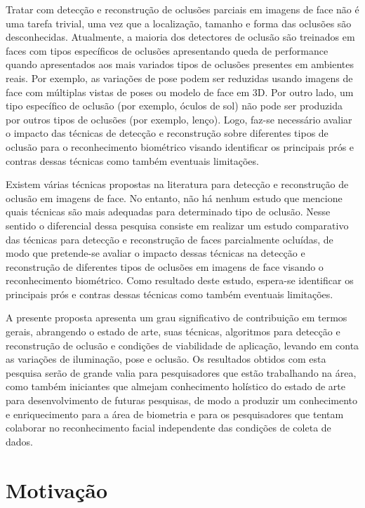 Tratar com detecção e reconstrução de oclusões parciais em imagens de face não é uma tarefa trivial,  uma vez que a localização, tamanho e forma das oclusões são desconhecidas. Atualmente, a maioria dos detectores de oclusão são treinados em faces com tipos específicos de oclusões apresentando queda de performance quando apresentados aos mais variados tipos de oclusões presentes em ambientes reais. Por exemplo, as variações de pose podem ser reduzidas usando imagens de face com múltiplas vistas de poses ou modelo de face em 3D. Por outro lado, um tipo específico de oclusão (por exemplo, óculos de sol) não pode ser produzida por outros tipos de oclusões (por exemplo, lenço). Logo,  faz-se necessário avaliar o impacto das técnicas de detecção e reconstrução sobre diferentes tipos de oclusão para o reconhecimento biométrico visando identificar os principais prós e contras dessas técnicas como também eventuais limitações.




Existem várias técnicas propostas na literatura para detecção e reconstrução de oclusão em imagens de face. No entanto, não há nenhum estudo que mencione quais técnicas são mais adequadas para determinado tipo de oclusão. Nesse sentido o diferencial dessa pesquisa consiste em realizar um estudo comparativo das técnicas para detecção e reconstrução de faces parcialmente ocluídas, de modo que pretende-se avaliar o impacto dessas técnicas na detecção e reconstrução de diferentes tipos de oclusões em imagens de face visando o reconhecimento biométrico. Como resultado deste estudo, espera-se identificar os principais prós e contras dessas técnicas como também eventuais limitações. 

A presente proposta apresenta um grau significativo de contribuição em termos gerais, abrangendo o estado de arte, suas técnicas, algoritmos para detecção e reconstrução de oclusão e condições de viabilidade de aplicação, levando em conta as variações de iluminação, pose e oclusão. Os resultados obtidos com esta pesquisa serão de grande valia para pesquisadores que estão trabalhando na área, como também iniciantes que almejam conhecimento holístico do estado de arte para desenvolvimento de futuras pesquisas, de modo a produzir um conhecimento e enriquecimento para a área de biometria e para os pesquisadores que tentam colaborar no reconhecimento facial independente das condições de coleta de dados.


\section{Motivação}

